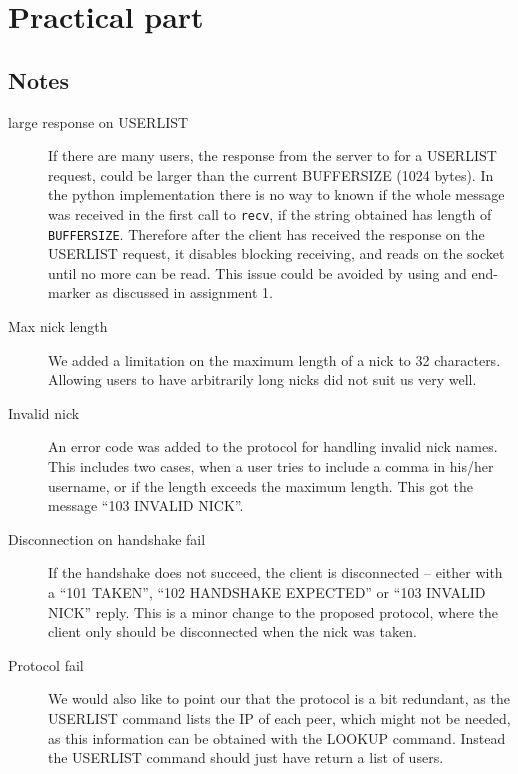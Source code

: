 \section{Practical part}

\subsection{Notes}
\begin{description}
    \item[large response on USERLIST]
        If there are many users, the response from the server to for a USERLIST request, could be larger than the current BUFFERSIZE (1024 bytes). In the python implementation there is no way to known if the whole message was received in the first call to \texttt{recv}, if the string obtained has length of \texttt{BUFFERSIZE}. Therefore after the client has received the response on the USERLIST request, it disables blocking receiving, and reads on the socket until no more can be read. This issue could be avoided by using and end-marker as discussed in assignment 1.
    \item[Max nick length]
        We added a limitation on the maximum length of a nick to 32 characters. Allowing users to have arbitrarily long nicks did not suit us very well.
    \item[Invalid nick]
        An error code was added to the protocol for handling invalid nick names. This includes two cases, when a user tries to include a comma in his/her username, or if the length exceeds the maximum length. This got the message ``103 INVALID NICK''.
    \item[Disconnection on handshake fail]
        If the handshake does not succeed, the client is disconnected -- either with a ``101 TAKEN'', ``102 HANDSHAKE EXPECTED'' or ``103 INVALID NICK'' reply. This is a minor change to the proposed protocol, where the client only should be disconnected when the nick was taken.
    \item[Protocol fail]
        We would also like to point our that the protocol is a bit redundant, as the USERLIST command lists the IP of each peer, which might not be needed, as this information can be obtained with the LOOKUP command. Instead the USERLIST command should just have return a list of users.
\end{description}

